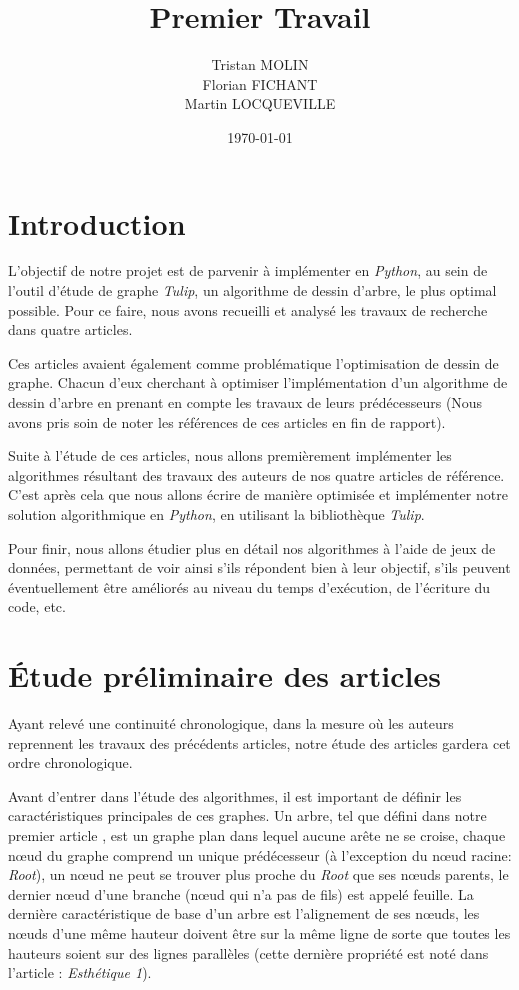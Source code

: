 \documentclass{article}
\title{Premier Travail}
\author{Tristan MOLIN\\Florian FICHANT\\Martin LOCQUEVILLE}
\date{\today}
\begin{document}
\maketitle

\tableofcontents

\newpage

\mainmatter

\section{Introduction}

L'objectif de notre projet est de parvenir à implémenter en \emph{Python}, au sein de l'outil d'étude de graphe \emph{Tulip}, un algorithme de dessin d'arbre, le plus optimal possible. Pour ce faire, nous avons recueilli et analysé les travaux de recherche dans quatre articles.

Ces articles avaient également comme problématique l'optimisation de dessin de graphe. Chacun d'eux cherchant à optimiser l'implémentation d'un algorithme de dessin d'arbre en prenant en compte les travaux de leurs prédécesseurs (Nous avons pris soin de noter les références de ces articles en fin de rapport).

Suite à l'étude de ces articles, nous allons premièrement implémenter les algorithmes résultant des travaux des auteurs de nos quatre articles de référence. C'est après cela que nous allons écrire de manière optimisée et implémenter notre solution algorithmique en \emph{Python}, en utilisant la bibliothèque \emph{Tulip}.

Pour finir, nous allons étudier plus en détail nos algorithmes à l'aide de jeux de données, permettant de voir ainsi s'ils répondent bien à leur objectif, s'ils peuvent éventuellement être améliorés au niveau du temps d'exécution, de l'écriture du code, etc.


\newpage
\section{Étude préliminaire des articles}

Ayant relevé une continuité chronologique, dans la mesure où les auteurs reprennent les travaux des précédents articles, notre étude des articles gardera cet ordre chronologique.

Avant d'entrer dans l'étude des algorithmes, il est important de définir les caractéristiques principales de ces graphes. Un arbre, tel que défini dans notre premier article \cite{article79}, est un graphe plan dans lequel aucune arête ne se croise, chaque n\oe{}ud du graphe comprend un unique prédécesseur (à l'exception du n\oe{}ud racine: \emph{Root}), un n\oe{}ud ne peut se trouver plus proche du \emph{Root} que ses n\oe{}uds parents, le dernier n\oe{}ud d'une branche (n\oe{}ud qui n'a pas de fils) est appelé feuille. La dernière caractéristique de base d'un arbre est l'alignement de ses n\oe{}uds, les n\oe{}uds d’une même hauteur doivent être sur la même ligne de sorte que toutes les hauteurs soient sur des lignes parallèles (cette dernière propriété est noté dans l'article \cite{article79}: \emph{Esthétique 1}).
\end{document}
